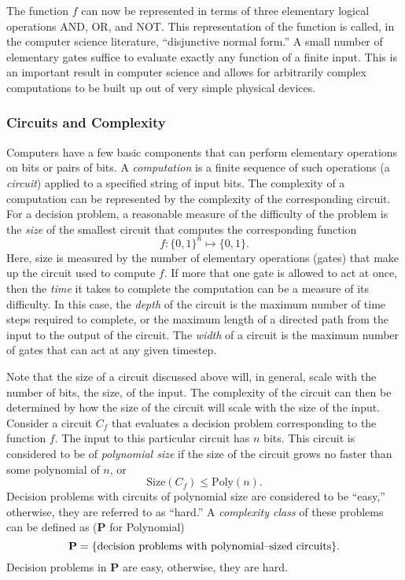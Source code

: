 The function $f$ can now be represented in terms of three elementary
logical operations AND, OR, and NOT.  This representation of the 
function is called, in the computer science literature, ``disjunctive
normal form.''
A small number of elementary gates suffice to evaluate
exactly any function of a finite input.  This is an important result
in computer science and allows for arbitrarily complex computations
to be built up out of very simple physical devices.

\subsubsection{Circuits and Complexity}

Computers have a few basic components that can perform elementary 
operations on bits or pairs of bits.  A {\sl computation} is a 
finite sequence of such operations (a \emph{circuit}) applied to a 
specified string of input bits.
The complexity of a computation can be represented by 
the complexity of the corresponding circuit.
For a decision problem, a reasonable measure of the difficulty
of the problem is the \emph{size} of the smallest circuit that
computes the corresponding function 
\begin{equation}    
f\colon\lbrace 0,1\rbrace^n \mapsto \lbrace 0,1\rbrace.
\end{equation}
Here, size is measured by the number of elementary operations 
(gates) that make up the circuit used to compute $f$.
If more that one gate is allowed to act at once, then the
\emph{time} it takes to complete the computation can be a measure
of its difficulty.  In this case, the \emph{depth} of the circuit
is the maximum number of time steps required to complete, or the 
maximum length of a directed path from the input to the output of
the circuit.  The \emph{width} of a circuit is the maximum number of
gates that can act at any given timestep.

Note that the size of a circuit discussed above
will, in general, scale with the number of bits, the size, of the input.  
The complexity of the circuit can then be determined by how 
the size of the circuit will scale with the size of the input.
Consider a circuit $C_f$ that evaluates a decision problem
corresponding to the function $f$.  The input to this particular
circuit has $n$ bits.  This circuit is considered to be of
\emph{polynomial size} if the size of the circuit grows no faster
than some polynomial of $n$, or
\begin{equation}
\text{Size}\left( C_f \right) \le \text{Poly}(n).
\end{equation}
Decision problems with circuits of polynomial size are considered
to be ``easy,'' otherwise, they are referred to as ``hard.''
A \emph{complexity class} of these problems 
can be defined as ({\bf P} for Polynomial)
\begin{equation}
{\bf P} = \lbrace\text{decision problems with polynomial--sized circuits}
          \rbrace.
\end{equation}
Decision problems in {\bf P} are easy, otherwise, they are hard.

